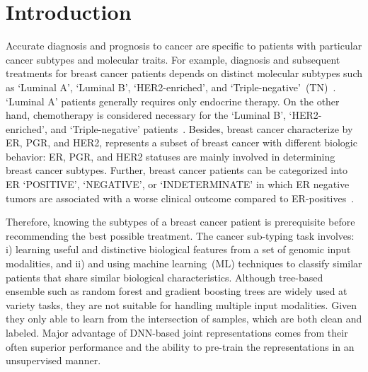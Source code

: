 \section{Introduction}
\label{secIntroduction_Motivation}
Accurate diagnosis and prognosis to cancer are specific to patients with particular cancer subtypes and molecular traits. For example, diagnosis and subsequent treatments for breast cancer patients depends on distinct molecular subtypes such as `Luminal A', `Luminal B', `HER2-enriched', and `Triple-negative'~(TN)~\cite{sorlie,dai}. `Luminal A' patients generally requires only endocrine therapy. On the other hand, chemotherapy is considered necessary for the `Luminal B', `HER2-enriched', and `Triple-negative' patients~\cite{goldhirsch}. Besides, breast cancer characterize by ER, PGR, and HER2, represents a subset of breast cancer with different biologic behavior: ER, PGR, and HER2 statuses are mainly involved in determining breast cancer subtypes. %
Further, breast cancer patients can be categorized into ER `POSITIVE', `NEGATIVE', or `INDETERMINATE' in which ER negative tumors are associated with a worse clinical outcome compared to ER-positives~\cite{karimACCA2019}. 

\hspace*{3.5mm} Therefore, knowing the subtypes of a breast cancer patient is prerequisite before recommending the best possible treatment. The cancer sub-typing task involves: i) learning useful and distinctive biological features from a set of genomic input modalities, and ii) and using machine learning~(ML) techniques to classify similar patients that share similar biological characteristics. Although tree-based ensemble such as random forest and gradient boosting trees are widely used at variety tasks, they are not suitable for handling multiple input modalities. Given they only able to learn from the intersection of samples, which are both clean and labeled. Major advantage of DNN-based joint representations comes from their often superior performance and the ability to pre-train the representations in an unsupervised manner. 

